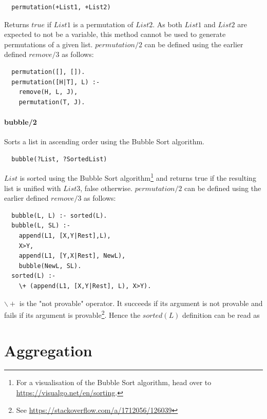 \documentclass{article}
\begin{document}
\begin{multicols}{2}
  \begin{lstlisting}
  permutation(+List1, +List2)
  \end{lstlisting}
  
  Returns $true$ if $List1$ is a permutation of $List2$. As both $List1$ and $List2$ are expected to not be a variable, this method cannot be used to generate permutations of a given list. $permutation/2$ can be defined using the earlier defined $remove/3$ as follows:

  \begin{lstlisting}
  permutation([], []).
  permutation([H|T], L) :-
    remove(H, L, J),
    permutation(T, J).
  \end{lstlisting}  
  
  \paragraph{bubble/2} Sorts a list in ascending order using the Bubble Sort algorithm.
  
  \begin{lstlisting}
  bubble(?List, ?SortedList)
  \end{lstlisting}
  
  $List$ is sorted using the Bubble Sort algorithm\footnote{For a visualisation of the Bubble Sort algorithm, head over to \href{https://visualgo.net/en/sorting}{https://visualgo.net/en/sorting}.} and returns true if the resulting list is unified with $List3$, false otherwise. $permutation/2$ can be defined using the earlier defined $remove/3$ as follows:

  \begin{lstlisting}
  bubble(L, L) :- sorted(L).
  bubble(L, SL) :-
    append(L1, [X,Y|Rest],L),
    X>Y,
    append(L1, [Y,X|Rest], NewL),
    bubble(NewL, SL).
  sorted(L) :-
    \+ (append(L1, [X,Y|Rest], L), X>Y).
  \end{lstlisting}  

  $\backslash+$ is the "not provable" operator. It succeeds if its argument is not provable and fails if its argument is provable\footnote{See \href{https://stackoverflow.com/a/1712056/126039}{https://stackoverflow.com/a/1712056/126039}}. Hence the $sorted(L)$ definition can be read as 
  
  \section{Aggregation}
  

\end{multicols}
\end{document}
